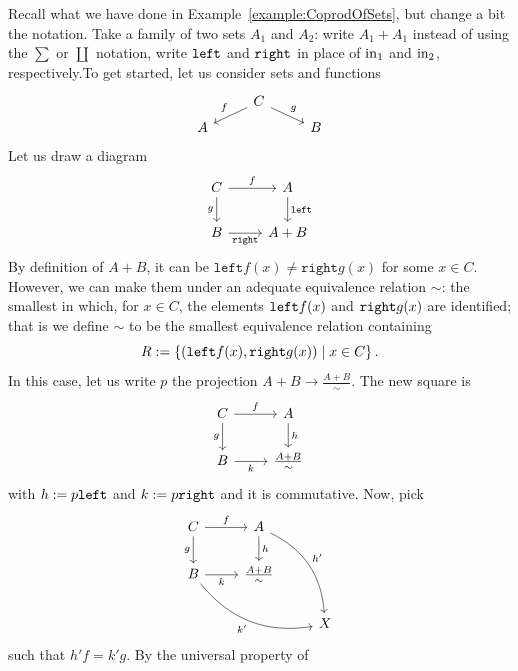 \begin{example}\label{example:PushoutsInSet}
  Recall what we have done in Example~\ref{example:CoprodOfSets}, but
  change a bit the notation. Take a family of two sets \(A_1\) and
  \(A_2\): write \(A_1+A_1\) instead of using the \(\sum\) or
  \(\coprod\) notation, write \(\mathtt{left}\) and \(\mathtt{right}\) in place of
  \(\operatorname{in}_1\) and \(\operatorname{in}_2\), respectively.\newline To get started, let
  us consider sets and functions
  \[\begin{tikzcd}[row sep=tiny]
      & C \ar["f", dl, swap] \ar["g", dr] &   \\
      A & & B
    \end{tikzcd}\] Let us draw a diagram
  \begin{equation}\begin{tikzcd}
      C \ar["f", r] \ar["g", d, swap]  & A \ar["\linj", d] \\
      B \ar["\rinj", r, swap] & A+B
    \end{tikzcd}\label{diagram:NotYetACommSquareInSet}\end{equation}
  By definition of \(A+B\), it can be
  \(\mathtt{left} f(x) \ne \mathtt{right} g(x)\) for some \(x \in
  C\). However, we can make them  under an adequate equivalence
  relation \(\sim\): the smallest in which, for \(x \in C\), the
  elements \(\mathtt{left} f(x)\) and \(\mathtt{right} g(x)\) are identified; that is we
  define \(\sim\) to be the smallest equivalence relation containing
  \[R := \left\{(\mathtt{left} f(x), \mathtt{right} g(x)) \mid x \in C\right\}.\] In this case,
  let us write \(p\) the projection \(A+B \to \frac{A+B}{\sim}\). The
  new square is
  \begin{equation}\begin{tikzcd}
      C \ar["f", r] \ar["g", d, swap] & A \ar["h", d]    \\
      B \ar["k", r, swap] & \frac{A+B}{\sim}
    \end{tikzcd}\label{diagram:NowACommSquareInSet}\end{equation}
  with \(h := p \mathtt{left}\) and \(k := p \mathtt{right}\) and it is commutative. Now,
  pick
  \[\begin{tikzcd}
      C \ar["f", r] \ar["g", d, swap] & A \ar["h", d] \ar["{h'}", ddr, bend left] \\
      B \ar["k", r, swap] \ar["{k'}", drr, bend right, swap] & \frac{A+B}{\sim} \\
      & & X
    \end{tikzcd}\] such that \(h'f = k'g\). By the universal property of

\end{example}
